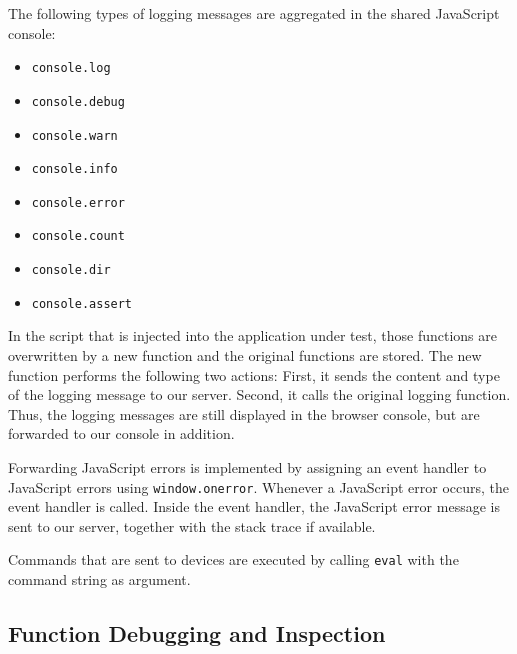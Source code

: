 The following types of logging messages are aggregated in the shared JavaScript console:
\begin{itemize}
	\item \lstinline|console.log|
	\item \lstinline|console.debug|
	\item \lstinline|console.warn|
	\item \lstinline|console.info|
	\item \lstinline|console.error|
	\item \lstinline|console.count|
	\item \lstinline|console.dir|
	\item \lstinline|console.assert|
\end{itemize}
In the script that is injected into the application under test, those functions are overwritten by a new function and the original functions are stored. The new function performs the following two actions: First, it sends the content and type of the logging message to our server. Second, it calls the original logging function. Thus, the logging messages are still displayed in the browser console, but are forwarded to our console in addition.

Forwarding JavaScript errors is implemented by assigning an event handler to JavaScript errors using \lstinline|window.onerror|. Whenever a JavaScript error occurs, the event handler is called. Inside the event handler, the JavaScript error message is sent to our server, together with the stack trace if available. 

Commands that are sent to devices are executed by calling \lstinline|eval| with the command string as argument.

\subsection{Function Debugging and Inspection}

